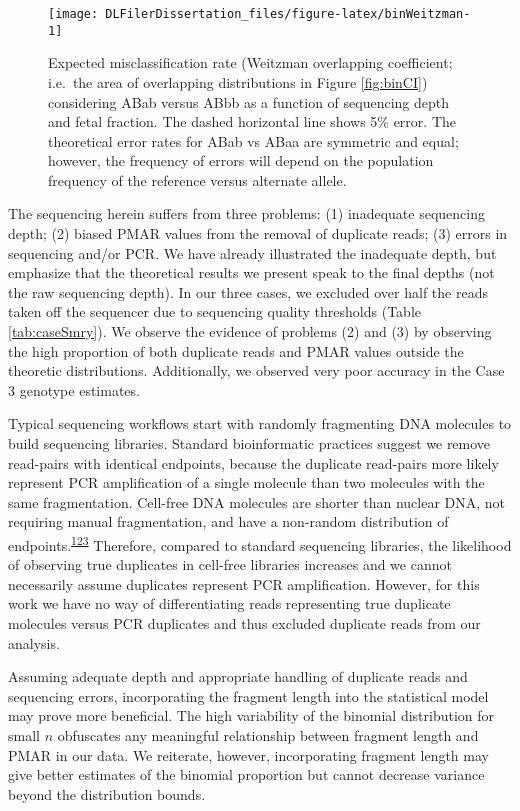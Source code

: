 \documentclass[11pt,letterpaper]{book}
\begin{document}
\begin{figure}

{\centering \texttt{[image: DLFilerDissertation\_files/figure-latex/binWeitzman-1]} 

}

\caption[(ref:binWeitzmanScap)]{Expected misclassification rate (Weitzman overlapping coefficient; i.e.~the area of overlapping distributions in Figure \ref{fig:binCI}) considering ABab versus ABbb as a function of sequencing depth and fetal fraction. The dashed horizontal line shows 5\% error. The theoretical error rates for ABab vs ABaa are symmetric and equal; however, the frequency of errors will depend on the population frequency of the reference versus alternate allele.}\label{fig:binWeitzman}
\end{figure}

The sequencing herein suffers from three problems: (1) inadequate sequencing depth; (2) biased PMAR values from the removal of duplicate reads; (3) errors in sequencing and/or PCR.
We have already illustrated the inadequate depth, but emphasize that the theoretical results we present speak to the final depths (not the raw sequencing depth).
In our three cases, we excluded over half the reads taken off the sequencer due to sequencing quality thresholds (Table \ref{tab:caseSmry}).
We observe the evidence of problems (2) and (3) by observing the high proportion of both duplicate reads and PMAR values outside the theoretic distributions.
Additionally, we observed very poor accuracy in the Case 3 genotype estimates.

Typical sequencing workflows start with randomly fragmenting DNA molecules to build sequencing libraries.
Standard bioinformatic practices suggest we remove read-pairs with identical endpoints, because the duplicate read-pairs more likely represent PCR amplification of a single molecule than two molecules with the same fragmentation.
Cell-free DNA molecules are shorter than nuclear DNA, not requiring manual fragmentation, and have a non-random distribution of endpoints.\textsuperscript{\protect\hyperlink{ref-chan:2016aa}{123}}
Therefore, compared to standard sequencing libraries, the likelihood of observing true duplicates in cell-free libraries increases and we cannot necessarily assume duplicates represent PCR amplification.
However, for this work we have no way of differentiating reads representing true duplicate molecules versus PCR duplicates and thus excluded duplicate reads from our analysis.

Assuming adequate depth and appropriate handling of duplicate reads and sequencing errors, incorporating the fragment length into the statistical model may prove more beneficial.
The high variability of the binomial distribution for small \(n\) obfuscates any meaningful relationship between fragment length and PMAR in our data.
We reiterate, however, incorporating fragment length may give better estimates of the binomial proportion but cannot decrease variance beyond the distribution bounds.
\end{document}
